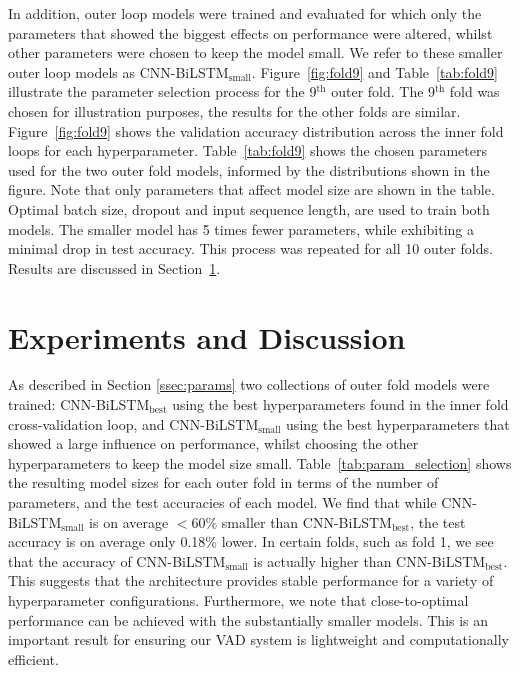\documentclass{article}
\begin{document}
In addition, outer loop models were trained and evaluated for which only the parameters that showed the biggest effects on performance were altered, whilst other parameters were chosen to keep the model small.
We refer to these smaller outer loop models as CNN-BiLSTM$_\text{small}$.
\mbox{Figure \ref{fig:fold9}} and \mbox{Table \ref{tab:fold9}} illustrate the parameter selection process for the 9$^{\text{th}}$ outer fold.
The 9$^{\text{th}}$ fold was chosen for illustration purposes, the results for the other folds are similar.
\mbox{Figure \ref{fig:fold9}} shows the validation accuracy distribution across the inner fold loops for each hyperparameter.
\mbox{Table \ref{tab:fold9}} shows the chosen parameters used for the two outer fold models, informed by the distributions shown in the figure.
Note that only parameters that affect model size are shown in the table.
Optimal batch size, dropout and input sequence length, are used to train both models.
The smaller model has 5 times fewer parameters, while exhibiting a minimal drop in test accuracy.
This process was repeated for all 10 outer folds.
Results are discussed in  \mbox{Section \ref{sec:experiments}}.

\vspace{-3mm}

\section{Experiments and Discussion}
\label{sec:experiments}

\vspace{-2mm}

As described in Section \ref{ssec:params} two collections of outer fold models were trained: CNN-BiLSTM$_\text{best}$ using the best hyperparameters found in the inner fold cross-validation loop, and CNN-BiLSTM$_\text{small}$ using the best hyperparameters that showed a large influence on performance, whilst choosing the other hyperparameters to keep the model size small.
\mbox{Table \ref{tab:param_selection}} shows the resulting model sizes for each outer fold in terms of the number of parameters, and the test accuracies of each model.
We find that while CNN-BiLSTM$_\text{small}$ is on average $<$60\% smaller than CNN-BiLSTM$_\text{best}$, the test accuracy is on average only 0.18\% lower.
In certain folds, such as fold 1, we see that the accuracy of CNN-BiLSTM$_\text{small}$ is actually higher than CNN-BiLSTM$_\text{best}$.
This suggests that the architecture provides stable performance for a variety of hyperparameter configurations.
Furthermore, we note that close-to-optimal performance can be achieved with the substantially smaller models.
This is an important result for ensuring our VAD system is lightweight and computationally efficient.
\end{document}
